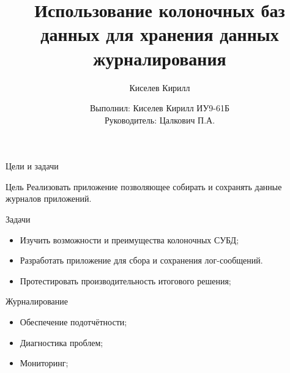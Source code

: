 \documentclass{beamer}
\title{Использование колоночных баз данных для хранения данных журналирования}
\author{Киселев Кирилл}
\author[me]{Выполнил: Киселев Кирилл ИУ9-61Б\\[1mm]Руководитель: Цалкович П.А.}
\begin{document}
\maketitle

\begin{frame}{Цели и задачи}
	\begin{alertblock}{Цель}
		Реализовать приложение позволяющее собирать и сохранять данные журналов приложений.
	\end{alertblock}
	\begin{alertblock}{Задачи}
		\begin{itemize}
			\item Изучить возможности и преимущества колоночных СУБД;
			\item Разработать приложение для сбора и сохранения лог-сообщений.
			\item Протестировать производительность итогового решения;
		\end{itemize}
	\end{alertblock}
\end{frame}


\begin{frame}{Журналирование}
	\begin{itemize}
		\item Обеспечение подотчётности;
		\item Диагностика проблем;
		\item Мониторинг;
	\end{itemize}
\end{frame}
\end{document}
